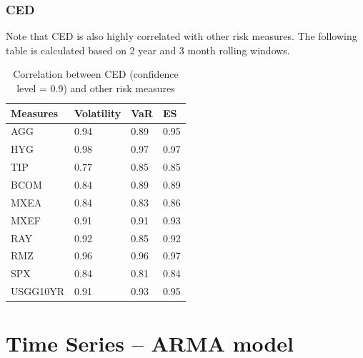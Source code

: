 \documentclass{beamer}
\newcommand\Fontviii{\fontsize{8}{9.2}\selectfont}
\begin{document}
\begin{frame}
\frametitle{CED}
\Fontviii

Note that CED is also highly correlated with other risk measures. The following table is calculated based on 2 year and 3 month rolling windows.

\begin{table}[!h]
\centering 
\begin{tabular}{ p{2cm}||p{2cm}|p{2cm}|p{2cm}} 
\hline
Measures & Volatility & VaR & ES\\
  \hline
AGG & 0.94 & 0.89 & 0.95\\ 
HYG & 0.98 & 0.97 & 0.97\\ 
TIP & 0.77 & 0.85 & 0.85\\ 
BCOM & 0.84 & 0.89 & 0.89\\ 
MXEA & 0.84 & 0.83 & 0.86\\ 
MXEF & 0.91 & 0.91 & 0.93\\ 
RAY & 0.92 & 0.85 & 0.92\\ 
RMZ & 0.96 & 0.96 & 0.97\\ 
SPX & 0.84 & 0.81 & 0.84\\ 
USGG10YR & 0.91 & 0.93 & 0.95\\
\hline
\end{tabular}
\label{table:corrRiskMeasureCED}
\caption{Correlation between CED (confidence level = 0.9) and other risk measures}
\end{table}

\end{frame}

\section{Time Series – ARMA model}

\end{document}
